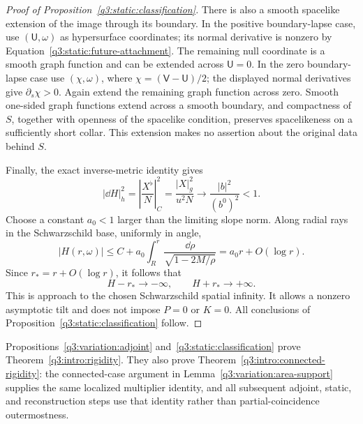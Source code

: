 \begin{proof}[Proof of Proposition~\ref{q3:static:classification}]
There is also a smooth spacelike extension of the image through
its boundary. In the positive boundary-lapse case, use
\((\mathsf U,\omega)\) as hypersurface coordinates; its normal
derivative is nonzero by
Equation~\eqref{q3:static:future-attachment}.
The remaining null coordinate is a smooth graph function and can
be extended across \(\mathsf U=0\).
In the zero boundary-lapse case use
\((\chi,\omega)\), where
\(\chi=(\mathsf V-\mathsf U)/2\); the displayed normal derivatives
give \(\partial_s\chi>0\).
Again extend the remaining graph function across zero.
Smooth one-sided graph functions extend across a smooth boundary,
and compactness of \(S\), together with openness of the spacelike
condition, preserves spacelikeness on a sufficiently short collar.
This extension makes no assertion about the original data behind
\(S\).

Finally, the exact inverse-metric identity gives
\begin{equation}
\label{q3:static:end-slope}
|\dd H|_h^2
=\left|\frac{X^\flat}{N}\right|_C^2
=\frac{|X|_g^2}{u^2N}
\longrightarrow\frac{|b|^2}{(b^0)^2}<1.
\end{equation}
Choose a constant \(a_0<1\) larger than the limiting slope norm.
Along radial rays in the Schwarzschild base, uniformly in angle,
\[
|H(r,\omega)|
\leq C+a_0\int_R^r
\frac{\dd\rho}{\sqrt{1-2M/\rho}}
=a_0r+O(\log r).
\]
Since \(r_*=r+O(\log r)\), it follows that
\[
H-r_*\longrightarrow-\infty,\qquad
H+r_*\longrightarrow+\infty.
\]
This is approach to the chosen Schwarzschild spatial infinity.
It allows a nonzero asymptotic tilt and does not impose \(P=0\)
or \(K=0\).
All conclusions of Proposition~\ref{q3:static:classification} follow.
\end{proof}

Propositions~\ref{q3:variation:adjoint} and~\ref{q3:static:classification}
prove Theorem~\ref{q3:intro:rigidity}. They also prove
Theorem~\ref{q3:intro:connected-rigidity}: the connected-case argument
in Lemma~\ref{q3:variation:area-support} supplies the same localized
multiplier identity, and all subsequent adjoint, static, and
reconstruction steps use that identity rather than
partial-coincidence outermostness.
